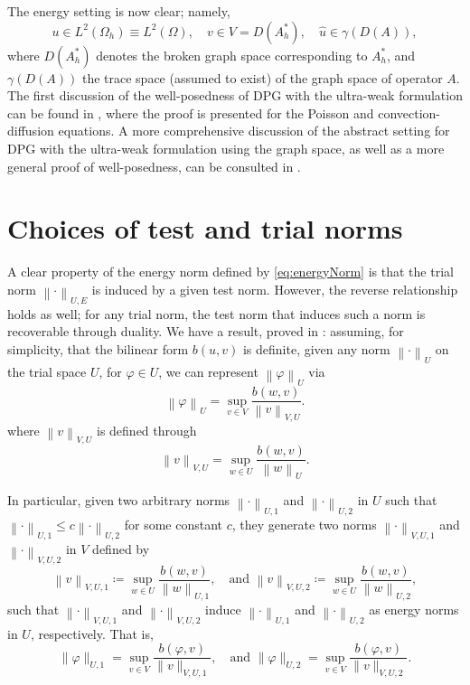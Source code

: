\documentclass{report}
\newcommand{\eqnref}[1]{\eqref{eq:#1}}
\newcommand{\seclab}[1]{\label{sec:#1}}
\newcommand{\nor}[1]{\left\| #1 \right\|}
\newcommand{\LRp}[1]{\left( #1 \right)}
\newcommand{\Oh}{\Omega_h}
\begin{document}
The energy setting is now clear; namely,
\[
u\in L^2\LRp{\Oh} \equiv L^2(\Omega), \quad v\in V=D(A^*_h), \quad
\widehat{u}\in \gamma(D(A)),
\]
where $D(A_h^*)$ denotes the broken graph space corresponding to $A_h^*$,
and $\gamma(D(A))$ the trace space (assumed to exist) of the graph space of
operator $A$. The first discussion of the well-posedness of DPG with the ultra-weak formulation can be found in \cite{analysisDPG}, where the proof is presented for the Poisson and convection-diffusion equations. A more comprehensive discussion of the abstract setting for DPG with the ultra-weak formulation using the graph space, as well as a more general proof of well-posedness, can be consulted in \cite{Bui-ThanhDemkowiczGhattas11b}. 

\section{Choices of test and trial norms}
\seclab{energyPair}

A clear property of the energy norm defined by \eqnref{energyNorm} is that the trial norm $\nor{\cdot}_{U,E}$ is induced by a given test norm. However, the reverse relationship holds as well; for any trial norm, the test norm that induces such a norm is recoverable through duality. We have a result, proved in \cite{Bui-ThanhDemkowiczGhattas11a}: assuming, for simplicity, that the bilinear form $b(u,v)$ is definite, given any norm $\nor{\cdot}_{U}$ on the trial space $U$, for $\varphi \in U$, we can represent $\nor{\varphi}_{U}$ via
\[
\nor{\varphi}_{U} = \sup_{v \in V}\frac{b\LRp{w,v}}{\nor{v}_{V,U}}.
\]
where $\nor{v}_{V,U}$ is defined through
\[
\nor{v}_{V,U} = \sup_{w \in U}\frac{b\LRp{w,v}}{\nor{w}_{U}}.
\]

In particular, given two arbitrary norms $\nor{\cdot}_{U,1}$ and $\nor{\cdot}_{U,2}$ in $U$
such that $\nor{\cdot}_{U,1} \le c \nor{\cdot}_{U,2}$ for some constant
$c$, they generate two norms $\nor{\cdot}_{V,U,1}$ and
$\nor{\cdot}_{V,U,2}$ in $V$ defined by
\[
\nor{v}_{V,U,1} \coloneqq \sup_{w \in U}\frac{b\LRp{w,v}}{\nor{w}_{U,1}}, \quad
\text{and }\nor{v}_{V,U,2} \coloneqq \sup_{w \in U}\frac{b\LRp{w,v}}{\nor{w}_{U,2}},
\]
such that $\nor{\cdot}_{V,U,1}$ and $\nor{\cdot}_{V,U,2}$ induce
$\nor{\cdot}_{U,1}$ and $\nor{\cdot}_{U,2}$ as energy
norms in $U$, respectively. That is,
\[
\|\varphi\|_{U,1} = \sup_{v\in V}
\frac{b(\varphi,v)}{\|v\|_{V,U,1}}, \quad \text{and }\|\varphi\|_{U,2} = \sup_{v\in V}
\frac{b(\varphi,v)}{\|v\|_{V,U,2}}.
\]
\end{document}
